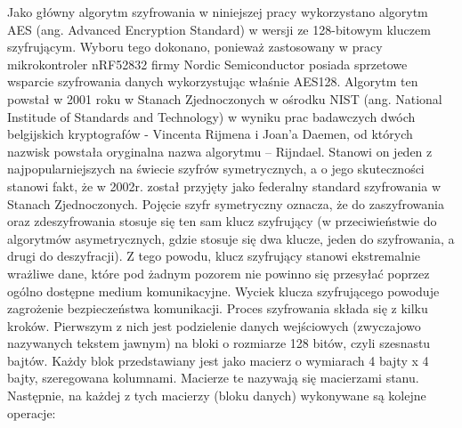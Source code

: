 Jako główny algorytm szyfrowania w niniejszej pracy wykorzystano algorytm AES (ang. Advanced Encryption Standard) w wersji ze 128-bitowym kluczem szyfrującym.  Wyboru tego dokonano, ponieważ zastosowany w pracy mikrokontroler nRF52832 firmy Nordic Semiconductor posiada sprzetowe wsparcie szyfrowania danych wykorzystując właśnie AES128. Algorytm ten powstał w 2001 roku w Stanach Zjednoczonych w ośrodku NIST (ang. National Institude of Standards and Technology) w wyniku prac badawczych dwóch belgijskich kryptografów - Vincenta Rijmena i Joan’a Daemen, od których nazwisk powstała oryginalna nazwa algorytmu – Rijndael. Stanowi on jeden z najpopularniejszych na świecie szyfrów symetrycznych, a o jego skuteczności stanowi fakt, że w 2002r. został przyjęty jako federalny standard szyfrowania w Stanach Zjednoczonych. Pojęcie szyfr symetryczny oznacza, że do zaszyfrowania oraz zdeszyfrowania stosuje się ten sam klucz szyfrujący (w przeciwieństwie do algorytmów asymetrycznych, gdzie stosuje się dwa klucze, jeden do szyfrowania, a drugi do deszyfracji). Z tego powodu, klucz szyfrujący stanowi ekstremalnie wrażliwe dane, które pod żadnym pozorem nie powinno się przesyłać poprzez ogólno dostępne medium komunikacyjne. Wyciek klucza szyfrującego powoduje zagrożenie bezpieczeństwa komunikacji.
Proces szyfrowania składa się z kilku kroków. Pierwszym z nich jest podzielenie danych wejściowych (zwyczajowo nazywanych tekstem jawnym) na bloki o rozmiarze 128 bitów, czyli szesnastu bajtów. Każdy blok przedstawiany jest jako macierz o wymiarach 4 bajty x 4 bajty, szeregowana kolumnami. Macierze te nazywają się macierzami stanu. Następnie, na każdej z tych macierzy (bloku danych) wykonywane są kolejne operacje:

